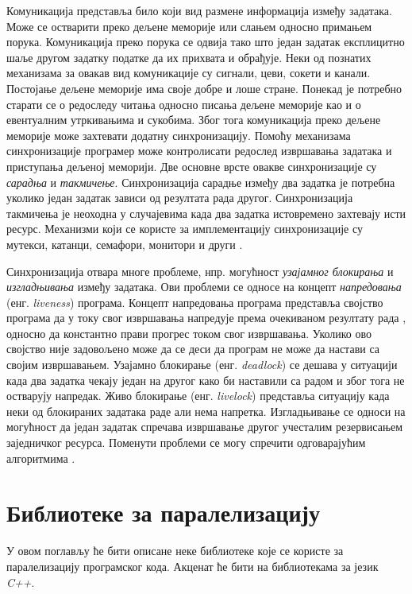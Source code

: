 \documentclass[12pt,oneside]{memoir}
\begin{document}
  
Комуникација представља било који вид размене информација између задатака. Може се остварити преко дељене меморије или слањем односно примањем порука. Комуникација преко порука се одвија тако што један задатак експлицитно шаље другом задатку податке да их прихвата и обрађује. Неки од познатих механизама за овакав вид комуникације су сигнали, цеви, сокети и канали.
Постојање дељене меморије има своје добре и лоше стране. Понекад је потребно старати се о редоследу читања односно писања дељене меморије као и о евентуалним утркивањима и сукобима. Због тога комуникација преко дељене меморије може захтевати додатну синхронизацију. Помоћу механизама синхронизације програмер може контролисати редослед извршавања задатака и приступања дељеној меморији. Две основне врсте овакве синхронизације су \textit{сарадња} и \textit{такмичење}. Синхронизација сарадње између два задатка је потребна уколико један задатак зависи од резултата рада другог. Синхронизација такмичења је неоходна у случајевима када два задатка истовремено захтевају исти ресурс. Механизми који се користе за имплементацију синхронизације су мутекси, катанци, семафори, монитори и други \cite{lang_prag}.

 Синхронизација отвара многе проблеме, нпр. могућност \textit{узајамног блокирања} и \textit{изгладњивања} између задатака. Ови проблеми се односе на концепт \textit{напредовања} (енг. \textit{liveness}) програма. Концепт напредовања програма представља својство програма да у току свог извршавања напредује према очекиваном резултату рада , односно да константно прави прогрес током свог извршавања. Уколико ово својство није задовољено може да се деси да програм не може да настави са својим извршавањем. Узајамно блокирање (енг. \textit{deadlock}) се дешава у ситуацији када два задатка чекају један на другог како би наставили са радом и због тога не остварују напредак. Живо блокирање (енг. \textit{livelock}) представља ситуацију када неки од блокираних задатака раде али нема напретка. Изгладњивање се односи на могућност да један задатак спречава извршавање другог учесталим резервисањем заједничког ресурса. Поменути проблеми се могу спречити одговарајућим алгоритмима \cite{opsis}.


  \section{Библиотеке за паралелизацију}
	У овом поглављу ће бити описане неке библиотеке које се користе за паралелизацију програмског кода. Акценат ће бити на библиотекама за језик \textit{C++}. 
	
\end{document}

